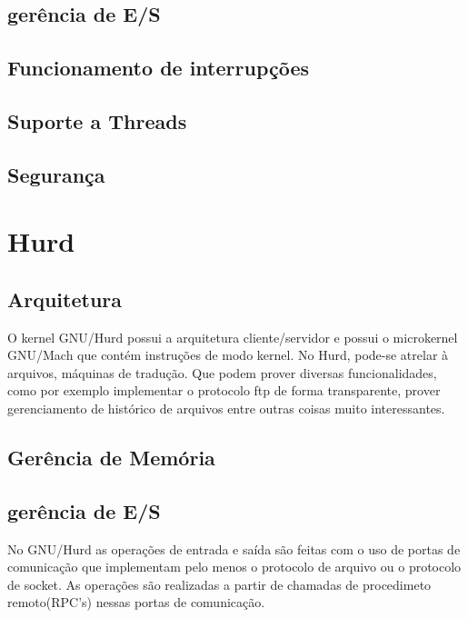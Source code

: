 \documentclass[conference]{IEEEtran}
\begin{document}
\subsection{gerência de E/S}\label{sec:BSDES}

\subsection{Funcionamento de interrupções}\label{sec:BSDInt}

\subsection{Suporte a Threads}\label{sec:BSDThreads}

\subsection{Segurança}\label{sec:BSDSec}

\section{Hurd}\label{sec:Hurd}

\subsection{Arquitetura}\label{sec:HurdArq}
O kernel GNU/Hurd possui a arquitetura cliente/servidor e possui o microkernel GNU/Mach que contém instruções de modo kernel. No Hurd, pode-se atrelar à arquivos, máquinas de tradução. Que podem prover diversas funcionalidades, como por exemplo implementar o protocolo ftp de forma transparente, prover gerenciamento de histórico de arquivos entre outras coisas muito interessantes.\cite{HurdPaper}

\subsection{Gerência de Memória}\label{sec:HurdMem}


\subsection{gerência de E/S}\label{sec:HurdES}
No GNU/Hurd as operações de entrada e saída são feitas com o uso de portas de comunicação que implementam pelo menos o protocolo de arquivo ou o protocolo de socket. As operações são realizadas a partir de chamadas de procedimeto remoto(RPC's) nessas portas de comunicação\cite{HurdIO}.
\end{document}
